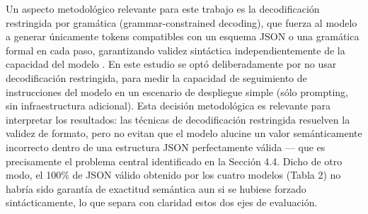 Un aspecto metodológico relevante para este trabajo es la decodificación
restringida por gramática (grammar-constrained decoding), que fuerza al
modelo a generar únicamente tokens compatibles con un esquema JSON o una
gramática formal en cada paso, garantizando validez sintáctica
independientemente de la capacidad del modelo
\cite{beurerkellner2024guiding,dong2024xgrammar}. En este estudio se optó
deliberadamente por no usar decodificación restringida, para medir la
capacidad de seguimiento de instrucciones del modelo en un escenario de
despliegue simple (sólo prompting, sin infraestructura adicional). Esta
decisión metodológica es relevante para interpretar los resultados: las
técnicas de decodificación restringida resuelven la validez de formato,
pero no evitan que el modelo alucine un valor semánticamente incorrecto
dentro de una estructura JSON perfectamente válida — que es precisamente el
problema central identificado en la Sección 4.4. Dicho de otro modo, el
100\% de JSON válido obtenido por los cuatro modelos (Tabla 2) no habría
sido garantía de exactitud semántica aun si se hubiese forzado
sintácticamente, lo que separa con claridad estos dos ejes de evaluación.
